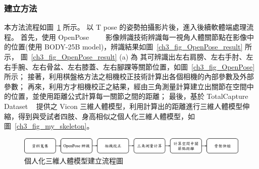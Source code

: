 
\subsubsection{建立方法}
本方法流程如圖~\ref{ch3_fig_skeleton_flow} 所示。
以 T pose 的姿勢拍攝影片後，進入後續軟體端處理流程。
首先，使用 OpenPose~\cite{8765346}~\cite{wei2016cpm}~\cite{simon2017hand}~\cite{cao2017realtime}
影像辨識技術辨識每一視角人體關節點在影像中的位置(使用 BODY-25B model)，辨識結果如圖~\ref{ch3_fig_OpenPose_result} 所示，
圖~\ref{ch3_fig_OpenPose_result} (a) 為
其可辨識出左右肩膀、左右手肘、左右手腕、左右骨盆、左右膝蓋、左右腳踝等關節位置，如圖~\ref{ch3_fig_OpenPose} 所示；
接著，利用棋盤格方法之相機校正技術計算出各個相機的內部參數及外部參數；
再來，利用方才相機校正之結果，經由三角測量計算建立出關節在空間中的位置，並使用距離公式計算每一關節之間的距離；
最後，基於 TotalCapture Dataset ~\cite{Trumble:BMVC:2017} 提供之 Vicon 三維人體模型，利用計算出的距離進行三維人體模型伸縮，得到與受試者四肢、身高相似之個人化三維人體模型，如圖~\ref{ch3_fig_my_skeleton}。

\begin{figure}[!ht]
   \centering
   \includegraphics[width=\linewidth]{figure/ch3_fig_skeleton_flow.png}
    \caption[個人化三維人體模型建立流程圖]{個人化三維人體模型建立流程圖}
    \label{ch3_fig_skeleton_flow}
\end{figure}

